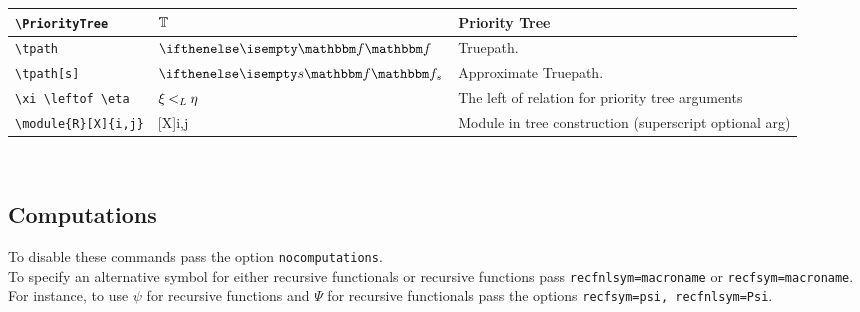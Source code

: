 \documentclass[leqno,11pt]{amsart}
\begin{document}
\begin{xtabular}{l |  l | l}\toprule
	\verb=\PriorityTree=					& \( 	\mathbb{T}                   \)	& Priority Tree \\ \midrule
	\verb=\tpath=					& \(  \tpath                   \)	& Truepath. \\ \midrule
	\verb=\tpath[s]=					& \( 	\tpath[s]                   \)	& Approximate Truepath. \\ \midrule
	\verb=\xi \leftof \eta =					& \( 	\xi \mathbin{<_L} \eta                   \)	& The left of relation for priority tree arguments \\ \midrule
	\verb=\module{R}[X]{i,j}=					&  [X]{i,j}  & Module in tree construction (superscript optional arg) \\ \midrule
	\end{xtabular}          \\





\subsection{Computations}
To disable these commands pass the option \verb=nocomputations=. \\  To specify an alternative symbol for either recursive functionals or recursive functions pass  \verb!recfnlsym=macroname! or \verb!recfsym=macroname!.  For instance, to use \( \psi \) for recursive functions and \( \Psi \) for recursive functionals pass the options \verb!recfsym=psi, recfnlsym=Psi!.  
\end{document}
